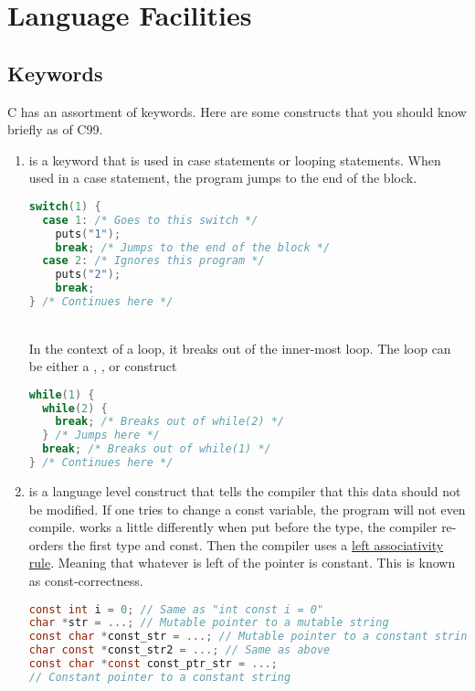 \section{Language Facilities}

\subsection{Keywords}

C has an assortment of keywords.
Here are some constructs that you should know briefly as of C99.

\begin{enumerate}
	\item {} is a keyword that is used in case statements or looping statements. When used in a case statement, the program jumps to the end of the block.
	      \\
	      \begin{lstlisting}[language=C]
switch(1) {
  case 1: /* Goes to this switch */
    puts("1");
    break; /* Jumps to the end of the block */
  case 2: /* Ignores this program */
    puts("2");
    break;
} /* Continues here */
\end{lstlisting}
	      \\
	      In the context of a loop, it breaks out of the inner-most loop. The loop can be either a , , or  construct
	      \\
	      \begin{lstlisting}[language=C]
while(1) {
  while(2) {
    break; /* Breaks out of while(2) */
  } /* Jumps here */
  break; /* Breaks out of while(1) */
} /* Continues here */
\end{lstlisting}
	    \item {} is a language level construct that tells the compiler that this data should not be modified.
        If one tries to change a const variable, the program will not even compile.
         works a little differently when put before the type, the compiler re-orders the first type and const.
        Then the compiler uses a \href{https://en.wikipedia.org/wiki/Operator_associativity}{left associativity rule}.
        Meaning that whatever is left of the pointer is constant.
        This is known as const-correctness.
	      \\
	      \begin{lstlisting}[language=C]
const int i = 0; // Same as "int const i = 0"
char *str = ...; // Mutable pointer to a mutable string
const char *const_str = ...; // Mutable pointer to a constant string
char const *const_str2 = ...; // Same as above
const char *const const_ptr_str = ...;
// Constant pointer to a constant string
\end{lstlisting}


\end{enumerate}
